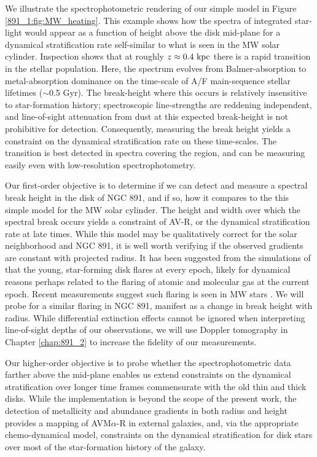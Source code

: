 We illustrate the spectrophotometric rendering of our simple model in
Figure \ref{891_1:fig:MW_heating}.  This example shows how the spectra
of integrated star-light would appear as a function of height above
the disk mid-plane for a dynamical stratification rate self-similar to
what is seen in the MW solar cylinder. Inspection shows that at
roughly $z \approx 0.4~\mathrm{kpc} $ there is a rapid transition in the
stellar population.  Here, the spectrum evolves from Balmer-absorption
to metal-absorption dominance on the time-scale of A/F main-sequence
stellar lifetimes ($\sim$0.5 Gyr). The break-height where this occurs
is relatively insensitive to star-formation history; spectroscopic
line-strengths are reddening independent, and line-of-sight
attenuation from dust at this expected break-height is not prohibitive
for detection.  Consequently, measuring the break height yields a
constraint on the dynamical stratification rate on these
time-scales. The transition is best detected in spectra covering the
 region, and can be measuring easily even with
low-resolution spectrophotometry.

Our first-order objective is to determine if we can detect and measure
a spectral break height in the disk of NGC 891, and if so, how it
compares to the this simple model for the MW solar cylinder. The
height and width over which the spectral break occurs yields a
constraint of AV-R, or the dynamical stratification rate at late
times. While this model may be qualitatively correct for the solar
neighborhood and NGC 891, it is well worth verifying if the observed
gradients are constant with projected radius.  It has been suggested
from the simulations of \citet{Martig14a} that the young, star-forming
disk flares at every epoch, likely for dynamical reasons perhaps
related to the flaring of atomic and molecular gas at the current
epoch. Recent measurements suggest such flaring is seen in MW stars
\citep{Ness16}. We will probe for a similar flaring in NGC 891,
manifest as a change in break height with radius.  While differential
extinction effects cannot be ignored when interpreting line-of-sight
depths of our observations, we will use Doppler tomography in Chapter
\ref{chap:891_2} \citep[see for example,][]{Kregel05} to increase the
fidelity of our measurements.

Our higher-order objective is to probe whether the spectrophotometric
data farther above the mid-plane enables us extend constraints on the
dynamical stratification over longer time frames commensurate with the
old thin and thick disks.  While the implementation is beyond the
scope of the present work, the detection of metallicity and abundance
gradients in both radius and height provides a mapping of
AVM$\alpha$-R in external galaxies, and, via the appropriate
chemo-dynamical model, constraints on the dynamical stratification for
disk stars over most of the star-formation history of the galaxy.

